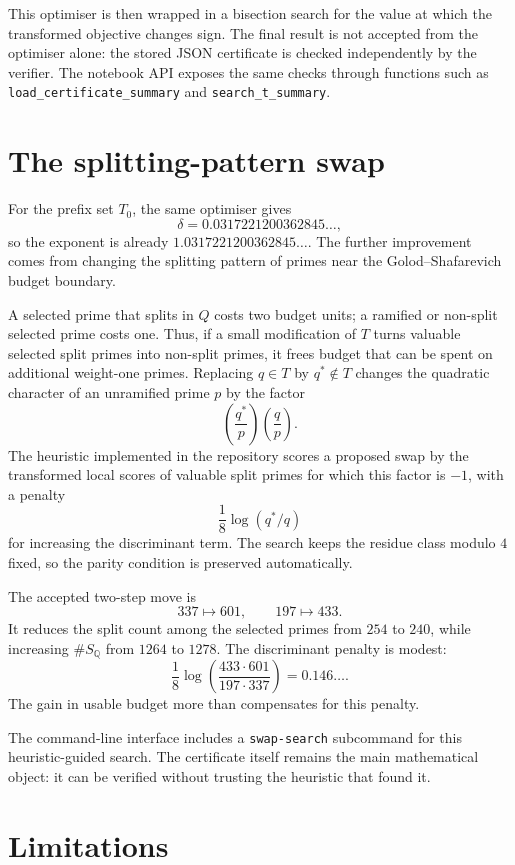 \documentclass[11pt]{amsart}
\newcommand{\QQ}{\mathbb{Q}}
\newcommand{\SQ}{S_{\QQ}}
\begin{document}
This optimiser is then wrapped in a bisection search for the value at which the transformed objective changes sign.  The final result is not accepted from the optimiser alone: the stored JSON certificate is checked independently by the verifier.  The notebook API exposes the same checks through functions such as \texttt{load\_certificate\_summary} and \texttt{search\_t\_summary}.

\section{The splitting-pattern swap}

For the prefix set $T_0$, the same optimiser gives
\[
  \delta=0.0317221200362845\ldots,
\]
so the exponent is already $1.0317221200362845\ldots$.  The further improvement comes from changing the splitting pattern of primes near the Golod--Shafarevich budget boundary.

A selected prime that splits in $Q$ costs two budget units; a ramified or non-split selected prime costs one.  Thus, if a small modification of $T$ turns valuable selected split primes into non-split primes, it frees budget that can be spent on additional weight-one primes.  Replacing $q\in T$ by $q^\ast\notin T$ changes the quadratic character of an unramified prime $p$ by the factor
\[
  \left(\frac{q^\ast}{p}\right)\left(\frac{q}{p}\right).
\]
The heuristic implemented in the repository scores a proposed swap by the transformed local scores of valuable split primes for which this factor is $-1$, with a penalty
\[
  \frac18\log(q^\ast/q)
\]
for increasing the discriminant term.  The search keeps the residue class modulo $4$ fixed, so the parity condition is preserved automatically.

The accepted two-step move is
\[
  337\mapsto 601,
  \qquad
  197\mapsto 433.
\]
It reduces the split count among the selected primes from $254$ to $240$, while increasing $\#\SQ$ from $1264$ to $1278$.  The discriminant penalty is modest:
\[
  \frac18\log\!\left(\frac{433\cdot 601}{197\cdot 337}\right)=0.146\ldots .
\]
The gain in usable budget more than compensates for this penalty.

The command-line interface includes a \texttt{swap-search} subcommand for this heuristic-guided search.  The certificate itself remains the main mathematical object: it can be verified without trusting the heuristic that found it.

\section{Limitations}
\end{document}
